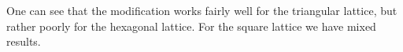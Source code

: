 \documentclass[smallextended]{svjour3}
\begin{document}
One can see that the modification works fairly well for the triangular
lattice, but rather poorly for the hexagonal lattice. For the square lattice
we have mixed results.

\begin{comment}
\subsection{Upper and lower bounds for the optimum}

Another approach is to include some good upper and lower bounds for
$\lambda$ in the formulation. In our case, of course, the proper
upper bound is in question. We used the algorithm of binary search
for determining it. The idea is to contract the lower and the upper
bound as long as the gap between them (upper bound minus lower bound)
is small enough. And the optimization may start only after this process
with the received limits. We took the value received from CPLEX in
the classical model for the initial lower bound, while we multiplied
it by 2 in the case of $\ell_{2}(dist)$, and by 3 in the case of
$\ell_{3}(dist)$, for the initial upper bound. In each iteration
either the lower bound is attempted to move upward or the upper bound
down. There is an admissibility problem solved each time. We set the
required gap to 0.5. Our results are shown in the following table
(only the running times are indicated, since the outcomes are the
same in both cases as above):

\begin{center}
\begin{tabular}{|c|c|c|}
\hline 
Lattice & $\ell_{2}(dist)=3-dist$ , new (s) & $\ell_{2}(dist)=3-dist$ , old (s)\\
\hline 
\hline 
Hexagonal & 13.28+135.43=148.71  & 4.57 \\
\hline 
Triangular & 447.24+883.27=1330.51 & 38.62 \\
\hline 
Square & 118.89+198.25=317.14 & 15.34 \\
\hline 
\multicolumn{1}{c}{
} & \multicolumn{1}{c}{
} & 
\\
\hline 
Lattice & $\ell_{3}(dist)=4-dist$ , new (s) & $\ell_{3}(dist)=4-dist$ , old (s)\\
\hline 
\hline 
Hexagonal & 337947+410468=748414  & 5777.68 \\
\hline 
Triangular & --- & 103883 \\
\hline 
Square & --- & 27793.8 \\
\hline 
\end{tabular}
\par\end{center}

The first addend in the sum is the running time needed for the calculation
of the bounds, while the second one is the running time needed for
the optimization itself. Incontrary to the expectations, the method
did not improve the program, and even slowed it. And in addition,
after the reduction of the feasible set, it is difficult to cut off
some branches in the search tree (Bounding). Therefore the optimum
search takes longer time than previously. 
\end{comment}
\end{document}
